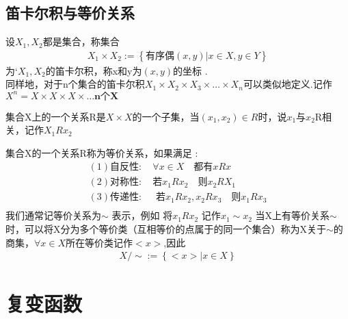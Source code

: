 \subsection*{笛卡尔积与等价关系}
\begin{definition}
    设\(X_1 ,X_2\)都是集合，称集合\begin{align}
        X_1 \times X_2 := \left\{\textbf{有序偶}(x,y)| x\in X ,y\in Y\right\}
    \end{align}
    为`\(X_1,X_2\)的笛卡尔积，称x和y为\((x,y)\)的坐标 .\\
    同样地，对于n个集合的笛卡尔积\(X_1 \times X_2 \times X_3 \times \dots \times X_n\)可以类似地定义.记作\(X^n=X \times X \times X \times \dots \textbf{n个X}\) 
\end{definition}
\begin{definition}
    集合X上的一个关系R是\(X \times X \)的一个子集，当\((x_1,x_2) \in R \)时，说\(x_1\)与\(x_2\)R相关，记作\(X_1 R x_2\)
\end{definition}
集合X的一个关系R称为等价关系，如果满足 : \[
\begin{array}{l}
 (1) \text{自反性}:\quad \forall x \in X \quad \text{都有}xRx     \\
 (2) \text{对称性} :\quad \text{若} x_1Rx_2\quad \text{则} x_2 R X_1                    \\
 (3)  \text{传递性} :\quad \text{ 若} x_1Rx_2,x_2Rx_3 \quad \text{则} x_1Rx_3                              \\     
\end{array}
\]
我们通常记等价关系为\(\sim\) 表示，例如 将\(x_1Rx_2\) 记作\(x_1 \sim x_2\)
当X上有等价关系\(\sim\) 时，可以将X分为多个等价类（互相等价的点属于的同一个集合）称为X关于\(\sim\)的商集，\(\forall x \in X \)所在等价类记作\(<x>\),因此\begin{align}\label{等价类定义}
    X/\sim := \left\{<x> | x \in X \right\}
\end{align}
\section{复变函数}
